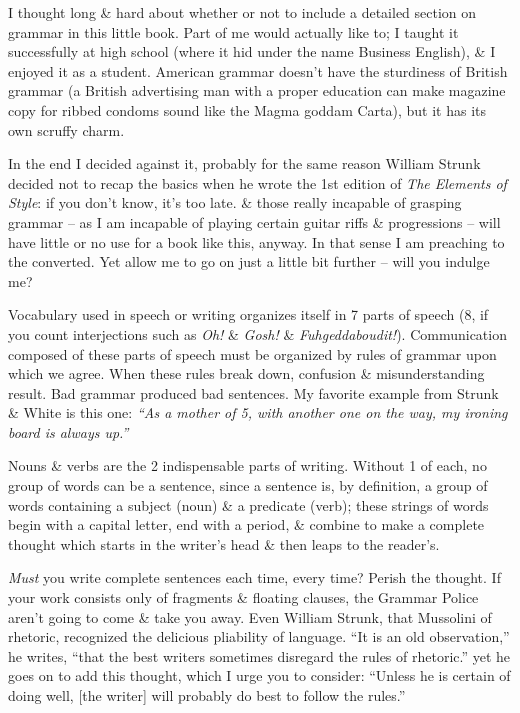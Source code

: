 \documentclass{article}
\numberwithin{equation}{section}
\begin{document}
I thought long \& hard about whether or not to include a detailed section on grammar in this little book. Part of me would actually like to; I taught it successfully at high school (where it hid under the name Business English), \& I enjoyed it as a student. American grammar doesn't have the sturdiness of British grammar (a British advertising man with a proper education can make magazine copy for ribbed condoms sound like the Magma goddam Carta), but it has its own scruffy charm.

In the end I decided against it, probably for the same reason William Strunk decided not to recap the basics when he wrote the 1st edition of \textit{The Elements of Style}: if you don't know, it's too late. \& those really incapable of grasping grammar -- as I am incapable of playing certain guitar riffs \& progressions -- will have little or no use for a book like this, anyway. In that sense I am preaching to the converted. Yet allow me to go on just a little bit further -- will you indulge me?

Vocabulary used in speech or writing organizes itself in 7 parts of speech (8, if you count interjections such as \textit{Oh!} \& \textit{Gosh!} \& \textit{Fuhgeddaboudit!}). Communication composed of these parts of speech must be organized by rules of grammar upon which we agree. When these rules break down, confusion \& misunderstanding result. Bad grammar produced bad sentences. My favorite example from Strunk \& White \cite{Strunk_White2019} is this one: \textit{``As a mother of 5, with another one on the way, my ironing board is always up.''}

Nouns \& verbs are the 2 indispensable parts of writing. Without 1 of each, no group of words can be a sentence, since a sentence is, by definition, a group of words containing a subject (noun) \& a predicate (verb); these strings of words begin with a capital letter, end with a period, \& combine to make a complete thought which starts in the writer's head \& then leaps to the reader's.

\textit{Must} you write complete sentences each time, every time? Perish the thought. If your work consists only of fragments \& floating clauses, the Grammar Police aren't going to come \& take you away. Even William Strunk, that Mussolini of rhetoric, recognized the delicious pliability of language. ``It is an old observation,'' he writes, ``that the best writers sometimes disregard the rules of rhetoric.'' yet he goes on to add this thought, which I urge you to consider: ``Unless he is certain of doing well, [the writer] will probably do best to follow the rules.''
\end{document}
